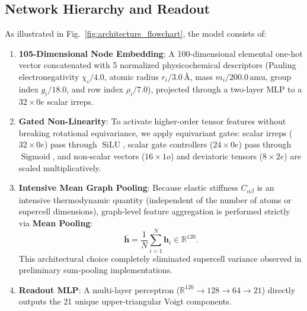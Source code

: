 \documentclass[twocolumn,10pt,aps,prb,superscriptaddress,floatfix]{revtex4-2}
\begin{document}
\subsection{Network Hierarchy and Readout}
As illustrated in Fig.~\ref{fig:architecture_flowchart}, the model consists of:
\begin{enumerate}
    \item \textbf{105-Dimensional Node Embedding}: A 100-dimensional elemental one-hot vector concatenated with 5 normalized physicochemical descriptors (Pauling electronegativity $\chi_i / 4.0$, atomic radius $r_i / 3.0\,\text{\AA}$, mass $m_i / 200.0\,\mathrm{amu}$, group index $g_i / 18.0$, and row index $\rho_i / 7.0$), projected through a two-layer MLP to a $32 \times 0e$ scalar irreps.
    \item \textbf{Gated Non-Linearity}: To activate higher-order tensor features without breaking rotational equivariance, we apply equivariant gates: scalar irreps ($32 \times 0e$) pass through $\operatorname{SiLU}$, scalar gate controllers ($24 \times 0e$) pass through $\operatorname{Sigmoid}$, and non-scalar vectors ($16 \times 1o$) and deviatoric tensors ($8 \times 2e$) are scaled multiplicatively.
    \item \textbf{Intensive Mean Graph Pooling}: Because elastic stiffness $C_{\alpha\beta}$ is an intensive thermodynamic quantity (independent of the number of atoms or supercell dimensions), graph-level feature aggregation is performed strictly via \textbf{Mean Pooling}:
    \begin{equation}
    \bar{\bm{h}} = \frac{1}{N} \sum_{i=1}^N \bm{h}_i \in \mathbb{R}^{120}.
    \label{eq:mean_pooling}
    \end{equation}
    This architectural choice completely eliminated supercell variance observed in preliminary sum-pooling implementations.
    \item \textbf{Readout MLP}: A multi-layer perceptron ($\mathbb{R}^{120} \rightarrow 128 \rightarrow 64 \rightarrow 21$) directly outputs the 21 unique upper-triangular Voigt components.
\end{enumerate}
\end{document}
